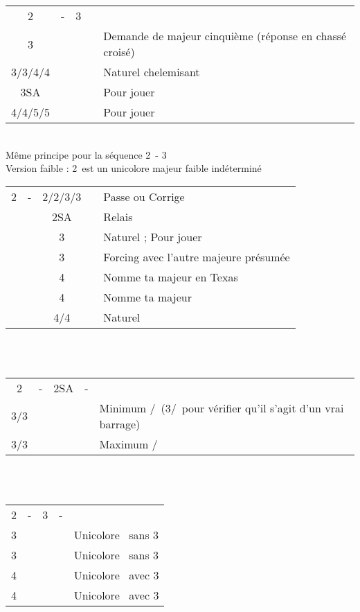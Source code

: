 \documentclass[a4paper, oneside, 11pt]{report}
\begin{document}
	\begin{tabular}{cccc|l}
	2\trefle & - & 3\trefle &&\\
	3\carreau &&&& Demande de majeur cinquième (réponse en chassé croisé)\\
	3\coeur/3\pique/4\trefle/4\carreau &&&& Naturel chelemisant\\
	3SA &&&& Pour jouer\\
	4\coeur/4\pique/5\trefle/5\carreau &&&& Pour jouer\\	
	\end{tabular}\\
	Même principe pour la séquence 2\trefle\ - 3\carreau\\

	Version faible : 2\carreau\ est un unicolore majeur faible indéterminé\\

	\begin{tabular}{cccc|l}
	2\carreau & - & 2\coeur/2\pique/3\coeur/3\pique && Passe ou Corrige\\
	&& 2SA && Relais\\
	&& 3\trefle && Naturel ; Pour jouer\\
	&& 3\carreau && Forcing avec l'autre majeure présumée\\
	&& 4\trefle && Nomme ta majeur en Texas\\
	&& 4\carreau && Nomme ta majeur\\
	&& 4\coeur/4\pique && Naturel\\
	\end{tabular}\\\\

	\begin{tabular}{cccc|l}
	2\carreau & - & 2SA & - &\\
	3\trefle/3\carreau &&&& Minimum \coeur/\pique\ (3\carreau/\coeur\ pour vérifier qu'il s'agit d'un vrai barrage)\\
	3\coeur/3\pique &&&& Maximum \pique/\coeur\\
	\end{tabular}\\\\
	
	\begin{tabular}{cccc|l}
	2\carreau & - & 3\carreau & - &\\
	3\coeur &&&& Unicolore \coeur\ sans 3\pique\\
	3\pique &&&& Unicolore \pique\ sans 3\coeur\\
	4\trefle &&&& Unicolore \coeur\ avec 3\pique\\
	4\carreau &&&& Unicolore \pique\ avec 3\coeur\\
	\end{tabular}\\\\
\end{document}
